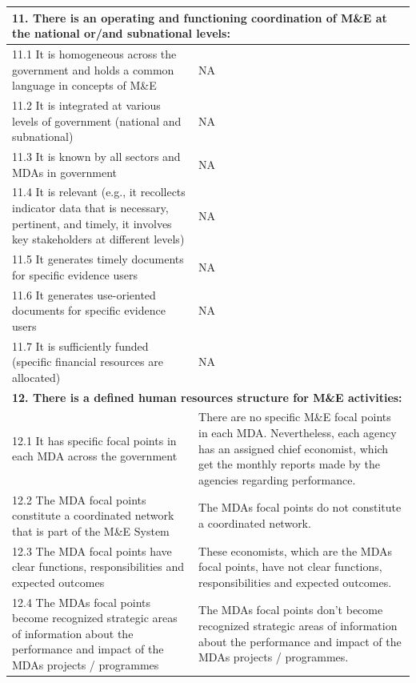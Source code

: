 \documentclass[
  10pt,
]{book}
\begin{document}
\begin{table}
\begin{tabular}[t]{l|l}
\hline
\multicolumn{2}{l}{\textbf{11. There is an operating and functioning coordination of M\&E at the national or/and subnational levels:}}\\
\hline
\hspace{1em}11.1 It is homogeneous across the government and holds a common language in concepts of M\&E & NA\\
\hline
\hspace{1em}11.2 It is integrated at various levels of government (national and subnational) & NA\\
\hline
\hspace{1em}11.3 It is known by all sectors and MDAs in government & NA\\
\hline
\hspace{1em}11.4 It is relevant (e.g., it recollects indicator data that is necessary, pertinent, and timely, it involves key stakeholders at different levels) & NA\\
\hline
\hspace{1em}11.5 It generates timely documents for specific evidence users & NA\\
\hline
\hspace{1em}11.6 It generates use-oriented documents for specific evidence users & NA\\
\hline
\hspace{1em}11.7 It is sufficiently funded (specific financial resources are allocated) & NA\\
\hline
\multicolumn{2}{l}{\textbf{12. There is a defined human resources structure for M\&E activities:}}\\
\hline
\hspace{1em}12.1 It has specific focal points in each MDA across the government & There are no specific M\&E focal points in each MDA. Nevertheless, each agency has an assigned chief economist, which get the monthly reports made by the agencies regarding performance.\\
\hline
\hspace{1em}12.2 The MDA focal points constitute a coordinated network that is part of the M\&E System & The MDAs focal points do not constitute a coordinated network.\\
\hline
\hspace{1em}12.3 The MDA focal points have clear functions, responsibilities and expected outcomes & These economists, which are the MDAs focal points, have not clear functions, responsibilities and expected outcomes.\\
\hline
\hspace{1em}12.4 The MDAs focal points become recognized strategic areas of information about the performance and impact of the MDAs projects / programmes & The MDAs focal points don't become recognized strategic areas of information about the performance and impact of the MDAs projects / programmes.\\
\hline
\end{tabular}
\end{table}
\end{document}
